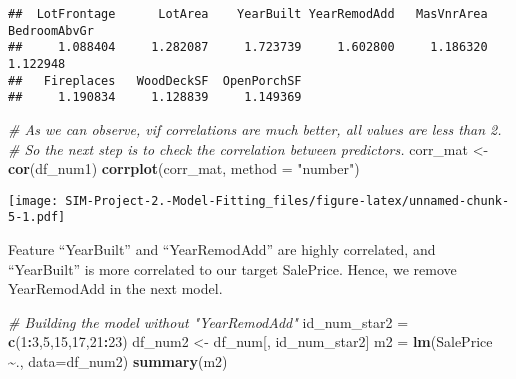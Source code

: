 \documentclass[
]{article}
\newenvironment{Shaded}{\begin{snugshade}}{\end{snugshade}}
\newcommand{\AttributeTok}[1]{\textcolor[rgb]{0.13,0.29,0.53}{#1}}
\newcommand{\CommentTok}[1]{\textcolor[rgb]{0.56,0.35,0.01}{\textit{#1}}}
\newcommand{\DecValTok}[1]{\textcolor[rgb]{0.00,0.00,0.81}{#1}}
\newcommand{\FunctionTok}[1]{\textcolor[rgb]{0.13,0.29,0.53}{\textbf{#1}}}
\newcommand{\NormalTok}[1]{#1}
\newcommand{\OtherTok}[1]{\textcolor[rgb]{0.56,0.35,0.01}{#1}}
\newcommand{\SpecialCharTok}[1]{\textcolor[rgb]{0.81,0.36,0.00}{\textbf{#1}}}
\newcommand{\StringTok}[1]{\textcolor[rgb]{0.31,0.60,0.02}{#1}}
\begin{document}
\begin{verbatim}
##  LotFrontage      LotArea    YearBuilt YearRemodAdd   MasVnrArea BedroomAbvGr 
##     1.088404     1.282087     1.723739     1.602800     1.186320     1.122948 
##   Fireplaces   WoodDeckSF  OpenPorchSF 
##     1.190834     1.128839     1.149369
\end{verbatim}

\begin{Shaded}
\begin{Highlighting}[]
\CommentTok{\# As we can observe, vif correlations are much better, all values are less than 2.}
\CommentTok{\# So the next step is to check the correlation between predictors.}
\NormalTok{corr\_mat }\OtherTok{\textless{}{-}} \FunctionTok{cor}\NormalTok{(df\_num1)}
\FunctionTok{corrplot}\NormalTok{(corr\_mat, }\AttributeTok{method =} \StringTok{"number"}\NormalTok{)}
\end{Highlighting}
\end{Shaded}

\texttt{[image: SIM-Project-2.-Model-Fitting\_files/figure-latex/unnamed-chunk-5-1.pdf]}

Feature ``YearBuilt'' and ``YearRemodAdd'' are highly correlated, and
``YearBuilt'' is more correlated to our target SalePrice. Hence, we
remove YearRemodAdd in the next model.

\begin{Shaded}
\begin{Highlighting}[]
\CommentTok{\# Building the model without "YearRemodAdd"}
\NormalTok{id\_num\_star2 }\OtherTok{=} \FunctionTok{c}\NormalTok{(}\DecValTok{1}\SpecialCharTok{:}\DecValTok{3}\NormalTok{,}\DecValTok{5}\NormalTok{,}\DecValTok{15}\NormalTok{,}\DecValTok{17}\NormalTok{,}\DecValTok{21}\SpecialCharTok{:}\DecValTok{23}\NormalTok{)}
\NormalTok{df\_num2 }\OtherTok{\textless{}{-}}\NormalTok{ df\_num[, id\_num\_star2]}
\NormalTok{m2 }\OtherTok{=} \FunctionTok{lm}\NormalTok{(SalePrice }\SpecialCharTok{\textasciitilde{}}\NormalTok{., }\AttributeTok{data=}\NormalTok{df\_num2)}
\FunctionTok{summary}\NormalTok{(m2)}
\end{Highlighting}
\end{Shaded}
\end{document}
